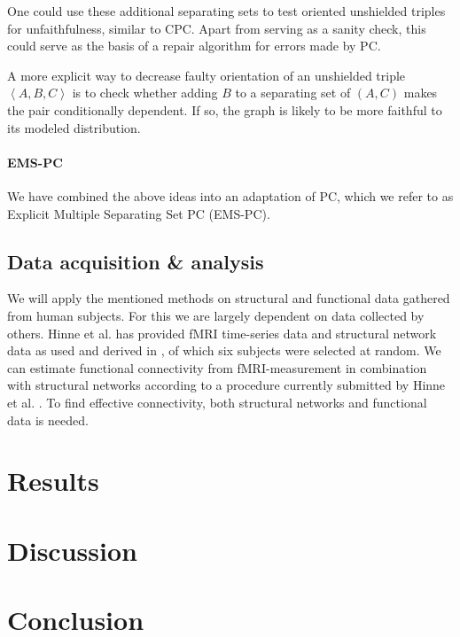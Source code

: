 \documentclass[a4paper, 10pt, english, onecolumn]{article}
\begin{document}
One could use these additional separating sets to test oriented unshielded triples for unfaithfulness, similar to CPC.
Apart from serving as a sanity check, this could serve as the basis of a repair algorithm for errors made by PC.

A more explicit way to decrease faulty orientation of an unshielded triple $\left<A,B,C\right>$ is to check whether adding $B$ to a separating set of $(A,C)$ makes the pair conditionally dependent.
If so, the graph is likely to be more faithful to its modeled distribution.

\paragraph{EMS-PC}
We have combined the above ideas into an adaptation of PC, which we refer to as Explicit Multiple Separating Set PC (EMS-PC).

\subsection*{Data acquisition \& analysis}
We will apply the mentioned methods on structural and functional data gathered from human subjects.
For this we are largely dependent on data collected by others.
Hinne et al. has provided fMRI time-series data and structural network data as used and derived in \cite{hinne2013}, of which six subjects were selected at random.
We can estimate functional connectivity from fMRI-measurement in combination with structural 
networks according to a procedure currently submitted by Hinne et al. \cite{hinne2013submitted}.
To find effective connectivity, both structural networks and functional data is needed.


\section{Results}

\section{Discussion}

\section{Conclusion}

{}

\end{document}
